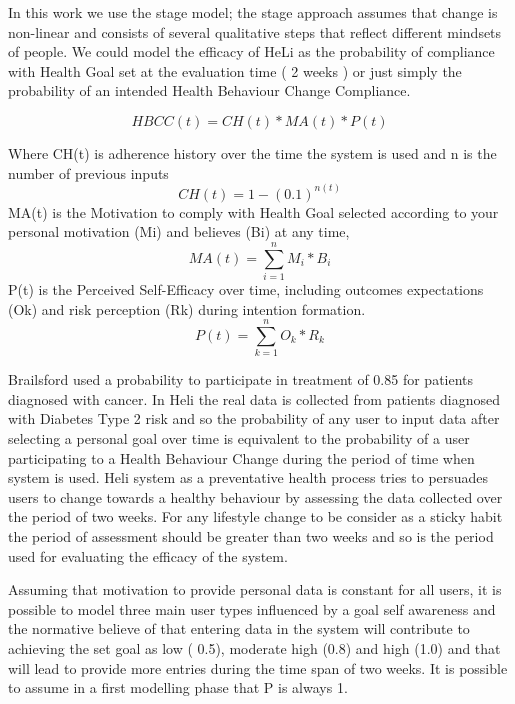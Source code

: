 \documentclass[graybox]{svmult}
\begin{document}
In this work we use the stage model; the stage approach assumes that change is non-linear and consists of several qualitative steps that reflect different mindsets of people.
We could model the efficacy of HeLi as the probability of compliance with Health Goal set at the evaluation time ( 2 weeks ) or just simply the probability of an intended Health Behaviour Change Compliance.

\begin{equation}
 	HBCC(t) =  CH(t) * MA(t) * P(t)
\label{Eq.HBChange}
\end{equation}

Where CH(t) is adherence history over the time the system is used and n is the number of previous inputs
\begin{equation}
           CH(t) =   1 - (0.1)^ {n(t)} 
\label{Eq.ComplianceHistory}
\end{equation}
 MA(t) is the Motivation to comply with Health Goal selected according to your personal motivation (Mi) and believes (Bi) at any time,
 \begin{equation}
           MA(t) =  \sum_{i=1}^n M_i * B_i 
\label{Eq.MotivationHistory}
\end{equation}
  P(t) is the Perceived Self-Efficacy over time, including outcomes expectations (Ok) and risk perception (Rk)  during intention formation.
  \begin{equation}
           P(t) =  \sum_{k=1}^n O_k * R_k
\label{Eq.PerceivedSE}
\end{equation}

    Brailsford used a probability to participate in treatment of 0.85 \cite{Brailsford2016} for patients diagnosed with cancer.  In Heli the real data is collected from patients diagnosed with Diabetes Type 2 risk and so the probability of any user to input data after selecting a personal goal over time is equivalent to the probability of a user participating to a Health Behaviour Change during the period of time when system is used. Heli system as a preventative health process tries to persuades users to change towards a healthy behaviour by assessing the data collected over the period of two weeks. For any lifestyle change to be consider as a sticky habit the period of assessment should be greater  than two weeks and so is the period used for evaluating the efficacy of the system. 
    
   Assuming that motivation to provide personal data is constant for all users, it is possible to model three main user types influenced by a goal self awareness and the normative believe of that entering data in the system will contribute to achieving the set goal as low ( 0.5), moderate high (0.8) and high (1.0) and that will lead to provide more entries during the time span of two weeks. It is possible to assume in a first modelling phase that P is always 1.
   
\end{document}
